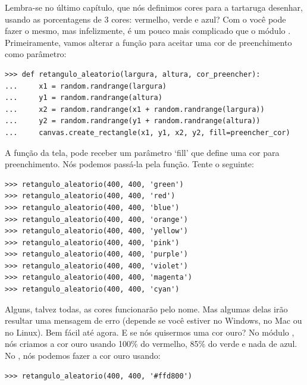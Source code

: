 Lembra-se no último capítulo, que nós definimos cores para a tartaruga desenhar, usando as porcentagens de 3 cores: vermelho, verde e azul? Com o  você pode fazer o mesmo, mas infelizmente, é um pouco mais complicado que o módulo . Primeiramente, vamos alterar a função  para aceitar uma cor de preenchimento como parâmetro:

\begin{listing}
\begin{verbatim}
>>> def retangulo_aleatorio(largura, altura, cor_preencher):
...     x1 = random.randrange(largura)
...     y1 = random.randrange(altura)
...     x2 = random.randrange(x1 + random.randrange(largura))
...     y2 = random.randrange(y1 + random.randrange(altura))
...     canvas.create_rectangle(x1, y1, x2, y2, fill=preencher_cor)
\end{verbatim}
\end{listing}

A função  da tela, pode receber um parâmetro `fill' que define uma cor para preenchimento. Nós podemos passá-la pela função. Tente o seguinte:

\begin{listing}
\begin{verbatim}
>>> retangulo_aleatorio(400, 400, 'green')
>>> retangulo_aleatorio(400, 400, 'red')
>>> retangulo_aleatorio(400, 400, 'blue')
>>> retangulo_aleatorio(400, 400, 'orange')
>>> retangulo_aleatorio(400, 400, 'yellow')
>>> retangulo_aleatorio(400, 400, 'pink')
>>> retangulo_aleatorio(400, 400, 'purple')
>>> retangulo_aleatorio(400, 400, 'violet')
>>> retangulo_aleatorio(400, 400, 'magenta')
>>> retangulo_aleatorio(400, 400, 'cyan')
\end{verbatim}
\end{listing}

Alguns, talvez todas, as cores funcionarão pelo nome. Mas algumas delas irão resultar uma mensagem de erro (depende se você estiver no Windows, no Mac ou no Linux). Bem fácil até agora. E se nós quisermos uma cor ouro? No módulo , nós criamos a cor ouro usando 100\% do vermelho, 85\% do verde e nada de azul. No , nós podemos fazer a cor ouro usando:

\begin{listing}
\begin{verbatim}
>>> retangulo_aleatorio(400, 400, '#ffd800')
\end{verbatim}
\end{listing}

